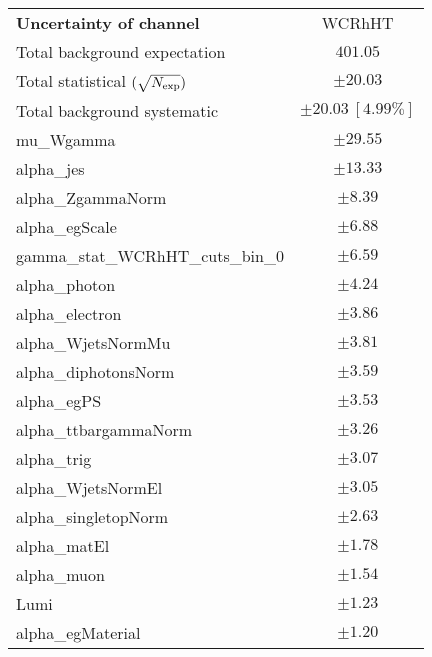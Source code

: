 
\begin{table}
\begin{center}
\setlength{\tabcolsep}{0.0pc}
\begin{tabular*}{\textwidth}{@{\extracolsep{\fill}}lc}
\noalign{\smallskip}\hline\noalign{\smallskip}
{\bf Uncertainty of channel}                                    & WCRhHT            \\
\noalign{\smallskip}\hline\noalign{\smallskip}
Total background expectation             &  $401.05$       \\
\noalign{\smallskip}\hline\noalign{\smallskip}
Total statistical $(\sqrt{N_{\rm exp}})$              & $\pm 20.03$       \\
Total background systematic               & $\pm 20.03\ [4.99\%] $             \\
\noalign{\smallskip}\hline\noalign{\smallskip}
\noalign{\smallskip}\hline\noalign{\smallskip}
mu\_Wgamma         & $\pm 29.55$       \\
alpha\_jes         & $\pm 13.33$       \\
alpha\_ZgammaNorm         & $\pm 8.39$       \\
alpha\_egScale         & $\pm 6.88$       \\
gamma\_stat\_WCRhHT\_cuts\_bin\_0         & $\pm 6.59$       \\
alpha\_photon         & $\pm 4.24$       \\
alpha\_electron         & $\pm 3.86$       \\
alpha\_WjetsNormMu         & $\pm 3.81$       \\
alpha\_diphotonsNorm         & $\pm 3.59$       \\
alpha\_egPS         & $\pm 3.53$       \\
alpha\_ttbargammaNorm         & $\pm 3.26$       \\
alpha\_trig         & $\pm 3.07$       \\
alpha\_WjetsNormEl         & $\pm 3.05$       \\
alpha\_singletopNorm         & $\pm 2.63$       \\
alpha\_matEl         & $\pm 1.78$       \\
alpha\_muon         & $\pm 1.54$       \\
Lumi         & $\pm 1.23$       \\
alpha\_egMaterial         & $\pm 1.20$       \\

\end{tabular*}
\end{center}
\end{table}
